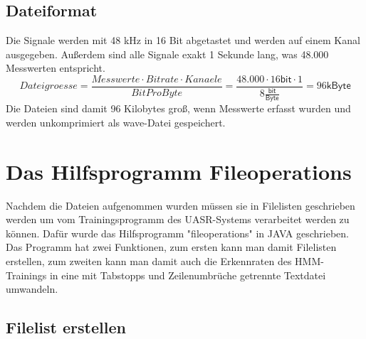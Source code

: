 \subsection{Dateiformat}

Die Signale werden mit 48 kHz in 16 Bit abgetastet und werden auf einem Kanal ausgegeben. Außerdem sind alle Signale exakt 1 Sekunde lang, was 48.000 Messwerten entspricht. 
\begin{equation}
Dateigroesse = \dfrac{Messwerte \cdot Bitrate \cdot Kanaele}{Bit Pro Byte} =
\dfrac{48.000 \cdot 16 \mathsf{bit} \cdot 1}{8 \frac{\mathsf{bit}}{\mathsf{Byte}}} = 96 \mathsf{kByte} 
\end{equation}
Die Dateien sind damit 96 Kilobytes groß, wenn Messwerte erfasst wurden und werden unkomprimiert als wave-Datei gespeichert.

\newpage
\section{Das Hilfsprogramm Fileoperations}

Nachdem die Dateien aufgenommen wurden müssen sie in Filelisten geschrieben werden um vom Trainingsprogramm des UASR-Systems verarbeitet werden zu können. Dafür wurde das Hilfsprogramm "fileoperations" in JAVA geschrieben.\\
Das Programm hat zwei Funktionen, zum ersten kann man damit Filelisten erstellen, zum zweiten kann man damit auch die Erkennraten des HMM-Trainings in eine mit Tabstopps und Zeilenumbrüche getrennte Textdatei umwandeln.

\subsection{Filelist erstellen}\label{flst}

